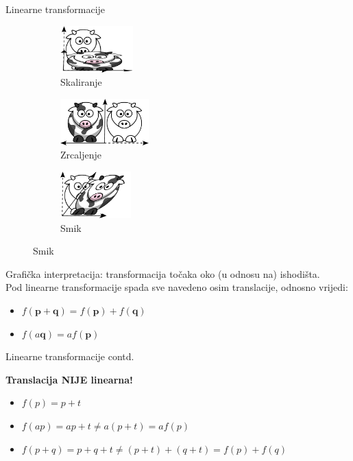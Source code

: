 \documentclass[9pt]{beamer}
\begin{document}
\begin{frame}{Linearne transformacije}
	\begin{figure}
		\begin{center}
			\begin{subfigure}[b]{0.3\linewidth}
				\includegraphics[height=1.8cm]{slike/funny_cow_scale_2.png}
				\caption{Skaliranje}
			\end{subfigure}
			\begin{subfigure}[b]{0.3\linewidth}
				\includegraphics[height=1.8cm]{slike/funny_cow_mirror.png}
				\caption{Zrcaljenje}
			\end{subfigure}
			\begin{subfigure}[b]{0.3\linewidth}
				\includegraphics[height=1.8cm]{slike/funny_cow_shear.png}
				\caption{Smik}
			\end{subfigure}
		\end{center}
	\end{figure}
	Grafička interpretacija: transformacija točaka oko (u odnosu na) ishodišta.\\
	Pod linearne transformacije spada sve navedeno osim translacije, odnosno vrijedi:
	\begin{itemize}
		\item $f(\mathbf{p}+\mathbf{q}) = f(\mathbf{p}) + f(\mathbf{q})$
		\item $f(a\mathbf{q}) = af(\mathbf{p})$
	\end{itemize}
\end{frame}


\begin{frame}{Linearne transformacije contd.}
	\begin{Large}
		\textbf{Translacija NIJE linearna!}
	\end{Large}
	\begin{itemize}
		\item $f(p) = p+t$
		\item $f(ap) = ap+t \neq a(p+t) = af(p)$
		\item $f(p+q) = p+q+t \neq (p+t)+(q+t) = f(p)+f(q)$
	\end{itemize}
\end{frame}
\end{document}
